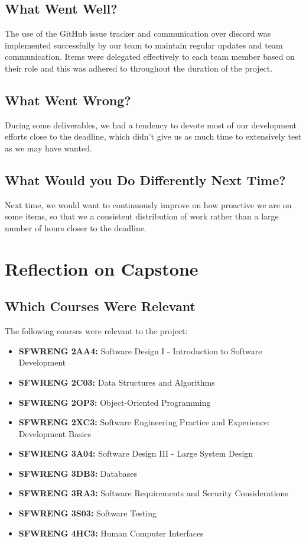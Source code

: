 \documentclass{article}
\begin{document}
\subsection{What Went Well?}

The use of the GitHub issue tracker and communication over discord was implemented successfully by our team to maintain regular
updates and team communication. Items were delegated effectively to each team member based on their role and this was adhered
to throughout the duration of the project.

\subsection{What Went Wrong?}

During some deliverables, we had a tendency to devote most of our development efforts close to the deadline, which didn't give
us as much time to extensively test as we may have wanted.

\subsection{What Would you Do Differently Next Time?}

Next time, we would want to continuously improve on how proactive we are on some items, so that we a consistent distribution of work
rather than a large number of hours closer to the deadline.

\section{Reflection on Capstone}

\subsection{Which Courses Were Relevant}
The following courses were relevant to the project:
\begin{itemize}
  \item \textbf{SFWRENG 2AA4:} Software Design I - Introduction to
    Software Development
  \item \textbf{SFWRENG 2C03:} Data Structures and Algorithms
  \item \textbf{SFWRENG 2OP3:} Object-Oriented Programming
  \item \textbf{SFWRENG 2XC3:} Software Engineering Practice and
    Experience: Development Basics
  \item \textbf{SFWRENG 3A04:} Software Design III - Large System Design
  \item \textbf{SFWRENG 3DB3:} Databases
  \item \textbf{SFWRENG 3RA3:} Software Requirements and Security Considerations
  \item \textbf{SFWRENG 3S03:} Software Testing
  \item \textbf{SFWRENG 4HC3:} Human Computer Interfaces
\end{itemize}
\end{document}
